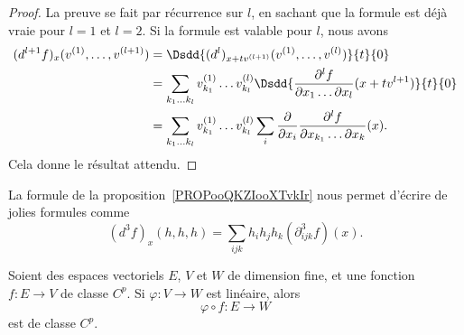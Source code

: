 \begin{proof}
	La preuve se fait par récurrence sur \( l\), en sachant que la formule est déjà vraie pour \( l=1\) et \( l=2\). Si la formule est valable pour \( l\), nous avons
	\begin{subequations}
		\begin{align}
			(d^{l+1}f)_x(v^{(1)},\ldots, v^{(l+1)}) & =\Dsdd{ (d^l)_{x+tv^{(l+1)}}(v^{(1)},\ldots, v^{(l)}) }{t}{0}                                                                                                 \\
			                                        & =\sum_{k_1\ldots k_l}v_{k_1}^{(1)}\ldots v_{k_l}^{(l)}\Dsdd{   \frac{ \partial^lf }{ \partial x_1\ldots \partial x_l }(x+tv^{l+1})   }{t}{0}                  \\
			                                        & =\sum_{k_1\ldots k_l}v_{k_1}^{(1)}\ldots v_{k_l}^{(l)}\sum_i\frac{ \partial  }{ \partial x_i }\frac{ \partial^lf }{ \partial x_{k_1}\ldots \partial x_k }(x).
		\end{align}
	\end{subequations}
	Cela donne le résultat attendu.
\end{proof}

\begin{normaltext}
	La formule de la proposition~\ref{PROPooQKZIooXTvkIr} nous permet d'écrire de jolies formules comme
	\begin{equation}        \label{EQooXRWWooMoKoOB}
		(d^3f)_x(h,h,h)=\sum_{ijk}h_ih_jh_k(\partial^3_{ijk}f)(x).
	\end{equation}
\end{normaltext}

\begin{proposition}
	Soient des espaces vectoriels \( E\),  \( V\) et \( W\) de dimension fine, et une fonction \( f\colon E\to V\) de classe \( C^p\). Si \( \varphi\colon V\to W\) est linéaire, alors
	\begin{equation}
		\varphi\circ f\colon E\to W
	\end{equation}
	est de classe \( C^p\).
\end{proposition}

